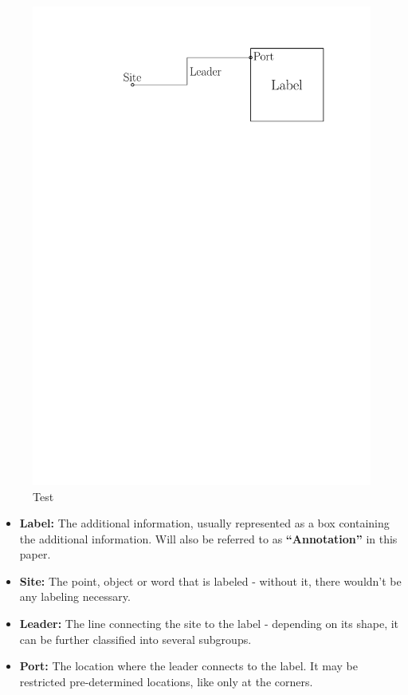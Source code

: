 \documentclass[11pt,a4paper]{article}
\begin{document}
\begin{figure}
 \captionsetup{justification=centering, margin=0.75cm}
 \raggedleft
  \includegraphics[scale=0.5]{IPE_TerminologyDrawing.pdf}
  \caption{Test}
 \label{fig:term}
\end{figure}

\begin{itemize}
 \item \textbf{Label:} The additional information, usually represented as a box containing the additional information. Will also be referred to as \textbf{``Annotation''} in this paper.
 \item \textbf{Site:} The point, object or word that is labeled - without it, there wouldn't be any labeling necessary.
 \item \textbf{Leader:} The line connecting the site to the label - depending on its shape, it can be further classified into several subgroups.
 \item \textbf{Port:} The location where the leader connects to the label. It may be restricted pre-determined locations, like only at the corners.
\end{itemize}
\end{document}
